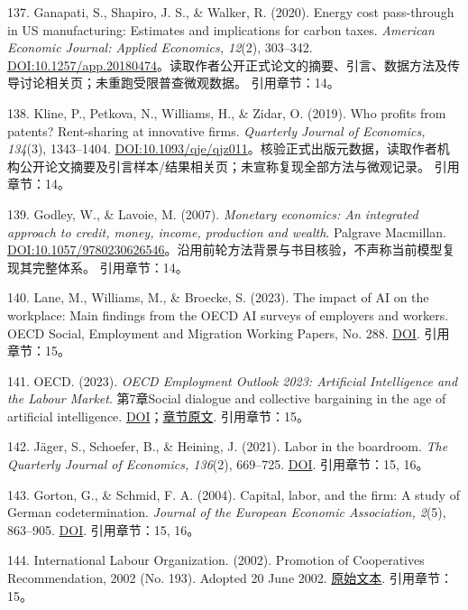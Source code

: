 \documentclass[UTF8,fontset=windows,12pt,a4paper,oneside,openany]{ctexbook}
\begin{document}
137. Ganapati, S., Shapiro, J. S., \& Walker, R. (2020). Energy cost pass-through in US manufacturing: Estimates and implications for carbon taxes. \emph{American Economic Journal: Applied Economics, 12}(2), 303–342. \href{https://doi.org/10.1257/app.20180474}{DOI:10.1257/app.20180474}。读取作者公开正式论文的摘要、引言、数据方法及传导讨论相关页；未重跑受限普查微观数据。
引用章节：14。

138. Kline, P., Petkova, N., Williams, H., \& Zidar, O. (2019). Who profits from patents? Rent-sharing at innovative firms. \emph{Quarterly Journal of Economics, 134}(3), 1343–1404. \href{https://doi.org/10.1093/qje/qjz011}{DOI:10.1093/qje/qjz011}。核验正式出版元数据，读取作者机构公开论文摘要及引言样本/结果相关页；未宣称复现全部方法与微观记录。
引用章节：14。

139. Godley, W., \& Lavoie, M. (2007). \emph{Monetary economics: An integrated approach to credit, money, income, production and wealth}. Palgrave Macmillan. \href{https://doi.org/10.1057/9780230626546}{DOI:10.1057/9780230626546}。沿用前轮方法背景与书目核验，不声称当前模型复现其完整体系。
引用章节：14。

140. Lane, M., Williams, M., \& Broecke, S. (2023). The impact of AI on the workplace: Main findings from the OECD AI surveys of employers and workers. OECD Social, Employment and Migration Working Papers, No. 288. \href{https://doi.org/10.1787/ea0a0fe1-en}{DOI}.
引用章节：15。

141. OECD. (2023). \emph{OECD Employment Outlook 2023: Artificial Intelligence and the Labour Market}. 第7章Social dialogue and collective bargaining in the age of artificial intelligence. \href{https://doi.org/10.1787/08785bba-en}{DOI}；\href{https://www.oecd.org/en/publications/2023/07/oecd-employment-outlook-2023_904bcef3/full-report/social-dialogue-and-collective-bargaining-in-the-age-of-artificial-intelligence_5828691a.html}{章节原文}.
引用章节：15。

142. Jäger, S., Schoefer, B., \& Heining, J. (2021). Labor in the boardroom. \emph{The Quarterly Journal of Economics, 136}(2), 669–725. \href{https://doi.org/10.1093/qje/qjaa038}{DOI}.
引用章节：15, 16。

143. Gorton, G., \& Schmid, F. A. (2004). Capital, labor, and the firm: A study of German codetermination. \emph{Journal of the European Economic Association, 2}(5), 863–905. \href{https://doi.org/10.1162/1542476042782260}{DOI}.
引用章节：15, 16。

144. International Labour Organization. (2002). Promotion of Cooperatives Recommendation, 2002 (No. 193). Adopted 20 June 2002. \href{https://webapps.ilo.org/public/english/standards/relm/ilc/ilc90/pdf/rec-193.pdf}{原始文本}.
引用章节：15。
\end{document}
